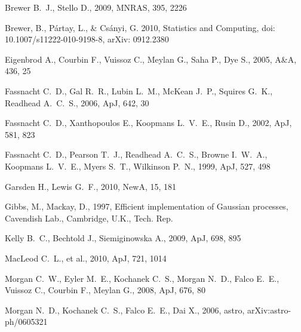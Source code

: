 \documentclass[useAMS,usenatbib, a4paper]{mn2e} \usepackage{natbib}
\begin{document}

\begin{thebibliography}{99} 
 Brewer B.~J., Stello D., 2009, MNRAS, 395, 2226

Brewer, B., P\'{a}rtay, L., \& Cs\'{a}nyi, G. 2010, Statistics and Computing, doi: 10.1007/s11222-010-9198-8, arXiv: 0912.2380

 Eigenbrod A., Courbin F., Vuissoz C., Meylan G., Saha P., Dye S., 2005, A\&A, 436, 25 

 Fassnacht C.~D., Gal R.~R., Lubin L.~M., 
McKean J.~P., Squires G.~K., Readhead A.~C.~S., 2006, ApJ, 642, 30 

 Fassnacht C.~D., Xanthopoulos E., Koopmans 
L.~V.~E., Rusin D., 2002, ApJ, 581, 823 

 Fassnacht C.~D., Pearson T.~J., Readhead 
A.~C.~S., Browne I.~W.~A., Koopmans L.~V.~E., Myers S.~T., Wilkinson P.~N., 
1999, ApJ, 527, 498 

 Garsden H., Lewis G.~F., 2010, NewA, 15, 181 

Gibbs, M., Mackay, D., 1997, Efficient implementation of Gaussian processes, Cavendish Lab., Cambridge, U.K., Tech. Rep.

 Kelly B.~C., Bechtold J., Siemiginowska A., 2009, ApJ, 698, 895 

 MacLeod C.~L., et al., 2010, ApJ, 721, 
1014 

Morgan C.~W., Eyler M.~E., Kochanek C.~S., Morgan N.~D., Falco E.~E., 
Vuissoz C., Courbin F., Meylan G., 2008, ApJ, 676, 80 

Morgan N.~D., Kochanek C.~S., Falco E.~E., Dai X., 2006, astro, 
arXiv:astro-ph/0605321 


\end{thebibliography}
\end{document}
